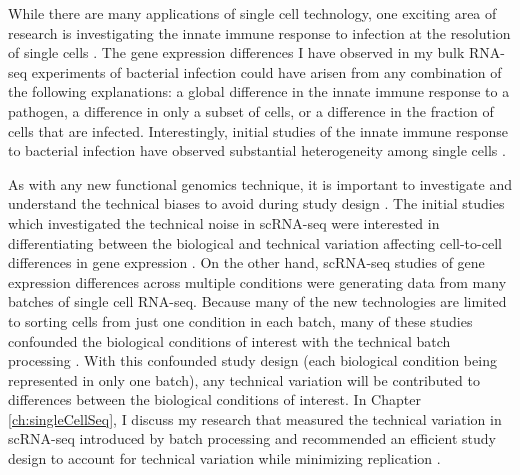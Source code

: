 While there are many applications of single cell technology, one
exciting area of research is investigating the innate immune response
to infection at the resolution of single cells \citep{Satija2014,
 Proserpio2016}. The gene expression differences I have observed in
my bulk RNA-seq experiments of bacterial infection could have arisen
from any combination of the following explanations: a global
difference in the innate immune response to a pathogen, a difference
in only a subset of cells, or a difference in the fraction of cells
that are infected. Interestingly, initial studies of the innate immune
response to bacterial infection have observed substantial
heterogeneity among single cells \citep{Shalek2013, Jaitin2014, Shalek2014, Avraham2015}.

As with any new functional genomics technique, it is important to
investigate and understand the technical biases to avoid during study
design \citep{Auer2010, Leek2010, Gilad2015}. The initial studies which investigated the technical noise in
scRNA-seq were interested in differentiating between the biological
and technical variation affecting cell-to-cell differences in gene
expression \citep{Brennecke2013, Grun2014, Islam2014, Ding2015, Vallejos2015}.
On the other hand, scRNA-seq studies of gene expression
differences across multiple conditions were generating data from many
batches of single cell RNA-seq. Because many of the new technologies
are limited to sorting cells from just one condition in each batch,
many of these studies confounded the biological conditions of interest
with the technical batch processing \citep{Hicks2015}. With this
confounded study design (each biological condition being
represented in only one batch), any technical variation will be
contributed to differences between the biological conditions of
interest. In Chapter \ref{ch:singleCellSeq}, I discuss my research
that measured the technical variation in scRNA-seq introduced by batch
processing and recommended an efficient study design to account for
technical variation while minimizing replication \citep{Tung2016}.
